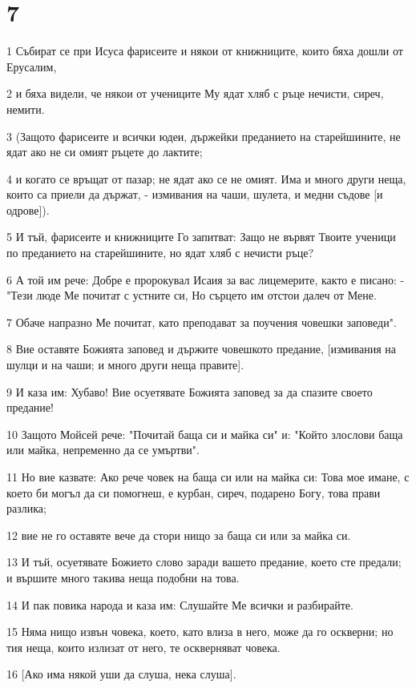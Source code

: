 \chapter{7}

\par 1 Събират се при Исуса фарисеите и някои от книжниците, които бяха дошли от Ерусалим,
\par 2 и бяха видели, че някои от учениците Му ядат хляб с ръце нечисти, сиреч, немити.
\par 3 (Защото фарисеите и всички юдеи, държейки преданието на старейшините, не ядат ако не си омият ръцете до лактите;
\par 4 и когато се връщат от пазар; не ядат ако се не омият. Има и много други неща, които са приели да държат, - измивания на чаши, шулета, и медни съдове [и одрове]).
\par 5 И тъй, фарисеите и книжниците Го запитват: Защо не вървят Твоите ученици по преданието на старейшините, но ядат хляб с нечисти ръце?
\par 6 А той им рече: Добре е пророкувал Исаия за вас лицемерите, както е писано: - "Тези люде Ме почитат с устните си, Но сърцето им отстои далеч от Мене.
\par 7 Обаче напразно Ме почитат, като преподават за поучения човешки заповеди".
\par 8 Вие оставяте Божията заповед и държите човешкото предание, [измивания на шулци и на чаши; и много други неща правите].
\par 9 И каза им: Хубаво! Вие осуетявате Божията заповед за да спазите своето предание!
\par 10 Защото Мойсей рече: "Почитай баща си и майка си" и: "Който злослови баща или майка, непременно да се умъртви".
\par 11 Но вие казвате: Ако рече човек на баща си или на майка си: Това мое имане, с което би могъл да си помогнеш, е курбан, сиреч, подарено Богу, това прави разлика;
\par 12 вие не го оставяте вече да стори нищо за баща си или за майка си.
\par 13 И тъй, осуетявате Божието слово заради вашето предание, което сте предали; и вършите много такива неща подобни на това.
\par 14 И пак повика народа и каза им: Слушайте Ме всички и разбирайте.
\par 15 Няма нищо извън човека, което, като влиза в него, може да го оскверни; но тия неща, които излизат от него, те оскверняват човека.
\par 16 [Ако има някой уши да слуша, нека слуша].
